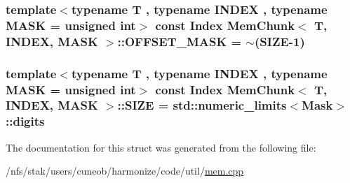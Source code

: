 \hypertarget{structMemChunk_a242fdf6095dc196c2700db11c31cab91}{
\subsubsection[{O\-F\-F\-S\-E\-T\-\_\-\-M\-A\-S\-K}]{\setlength{\rightskip}{0pt plus 5cm}template$<$typename T , typename I\-N\-D\-E\-X , typename M\-A\-S\-K  = unsigned int$>$ const {\bf Index} {\bf Mem\-Chunk}$<$ T, I\-N\-D\-E\-X, M\-A\-S\-K $>$\-::O\-F\-F\-S\-E\-T\-\_\-\-M\-A\-S\-K = $\sim$({\bf S\-I\-Z\-E}-\/1)\hspace{0.3cm}{\ttfamily [static]}}}\label{structMemChunk_a242fdf6095dc196c2700db11c31cab91}
\hypertarget{structMemChunk_a9f2b3f4f9c9d0b019f287be6796e2da3}{
\subsubsection[{S\-I\-Z\-E}]{\setlength{\rightskip}{0pt plus 5cm}template$<$typename T , typename I\-N\-D\-E\-X , typename M\-A\-S\-K  = unsigned int$>$ const {\bf Index} {\bf Mem\-Chunk}$<$ T, I\-N\-D\-E\-X, M\-A\-S\-K $>$\-::S\-I\-Z\-E = std\-::numeric\-\_\-limits$<${\bf Mask}$>$\-::digits\hspace{0.3cm}{\ttfamily [static]}}}\label{structMemChunk_a9f2b3f4f9c9d0b019f287be6796e2da3}


The documentation for this struct was generated from the following file\-:\begin{DoxyCompactItemize}
\item 
/nfs/stak/users/cuneob/harmonize/code/util/\hyperlink{mem_8cpp}{mem.\-cpp}\end{DoxyCompactItemize}
